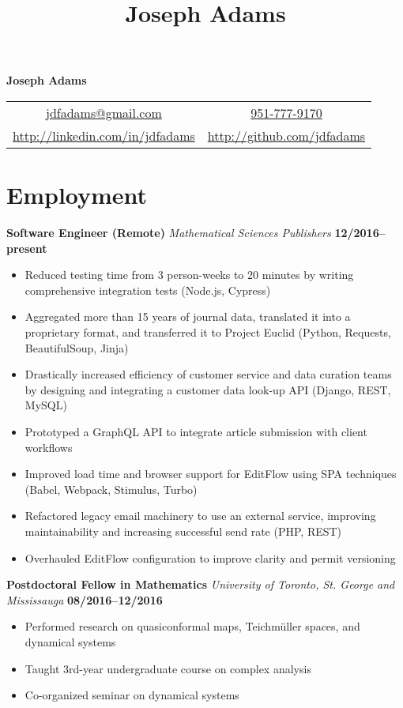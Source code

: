 \documentclass[11pt]{article}
\title{Joseph Adams}
\makeatletter
\newcommand\email{jdfadams@gmail.com}
\newcommand\phone{951-777-9170}
\makeatother
\begin{document}

\begin{center}
  \textbf{\Large Joseph Adams} \\[1.5\baselineskip]
  \begin{tabular}{c c}
    \href{mailto:\email}{\email} & \href{tel:1-\phone}{\phone} \\
    \url{http://linkedin.com/in/jdfadams} & \url{http://github.com/jdfadams}
  \end{tabular}
\end{center}

\section*{Employment}
\noindent\textbf{Software Engineer (Remote)} \emph{Mathematical Sciences Publishers} \hfill \textbf{12/2016--present}
\begin{itemize}
  \item Reduced testing time from 3 person-weeks to 20 minutes by writing comprehensive integration tests (Node.js, Cypress)
  \item Aggregated more than 15 years of journal data, translated it into a proprietary format, and transferred it to Project Euclid (Python, Requests, BeautifulSoup, Jinja)
  \item Drastically increased efficiency of customer service and data curation teams by designing and integrating a customer data look-up API (Django, REST, MySQL) 
  \item Prototyped a GraphQL API to integrate article submission with client workflows
  \item Improved load time and browser support for EditFlow using SPA techniques (Babel, Webpack, Stimulus, Turbo)
  \item Refactored legacy email machinery to use an external service, improving maintainability and increasing successful send rate (PHP, REST)
  \item Overhauled EditFlow configuration to improve clarity and permit versioning
\end{itemize}
\vspace{0.5cm}
\noindent\textbf{Postdoctoral Fellow in Mathematics} \emph{University of Toronto, St. George and Mississauga} \hfill \textbf{08/2016--12/2016}
\begin{itemize}
  \itemsep 0em
  \item Performed research on quasiconformal maps, Teichm\"{u}ller spaces, and dynamical systems
  \item Taught 3rd-year undergraduate course on complex analysis
  \item Co-organized seminar on dynamical systems
\end{itemize}
\end{document}
